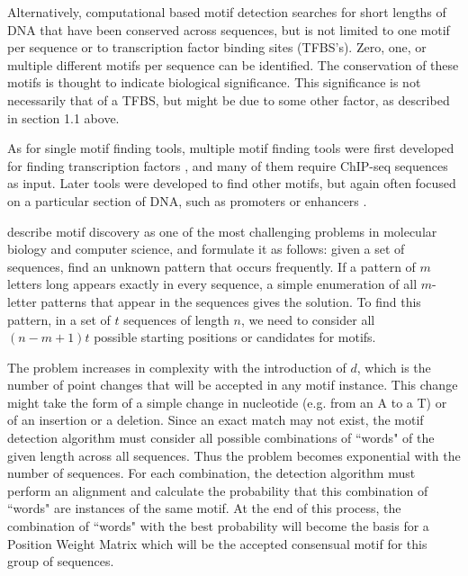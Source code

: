 \documentclass[12pt]{article}
\begin{document}
Alternatively, computational based motif detection searches for short lengths of DNA that have been conserved across sequences, but is not limited to one motif per sequence or to transcription factor binding sites (TFBS's). Zero, one, or multiple different motifs per sequence can be identified. The conservation of these motifs is thought to indicate biological significance. This significance is not necessarily that of a TFBS, but might be due to some other factor, as described in section 1.1 above. 

As for single motif finding tools, multiple motif finding tools were first developed for finding transcription factors \citep{dassi2016dynamit}, and many of them require ChIP-seq sequences as input. Later tools were developed to find other motifs, but again often focused on a particular section of DNA, such as promoters or enhancers  \citep{boeva2016analysis}.

\citet{das2007survey} describe motif discovery as one of the most challenging problems in molecular biology and computer science, and formulate it as follows:
given a set of sequences, find an unknown pattern that occurs frequently. If a pattern of $m$ letters long appears exactly in every sequence, a simple enumeration of all $m$-letter patterns that appear in the sequences gives the solution. To find this pattern, in a set of $t$ sequences of length $n$, we need to consider all $(n - m +1)t$ possible starting positions or candidates for motifs. 

The problem increases in complexity with the introduction of $d$, which is the number of point changes that will be accepted in any motif instance. This change might take the form of a simple change in nucleotide (e.g. from an A to a T) or of an insertion or a deletion. Since an exact match may not exist, the motif detection algorithm must consider all possible combinations of ``words" of the given length across all sequences. Thus the problem becomes exponential with the number of sequences. For each combination, the detection algorithm must perform an alignment and calculate the probability that this combination of ``words" are instances of the same motif. At the end of this process, the combination of ``words" with the best probability will become the basis for a Position Weight Matrix which will be the accepted consensual motif for this group of sequences. 
\end{document}
